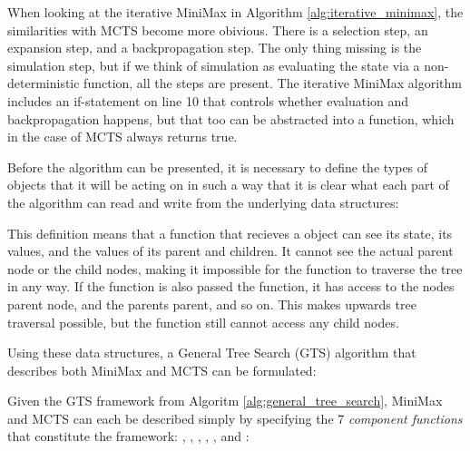 

When looking at the iterative MiniMax in Algorithm \ref{alg:iterative_minimax}, the similarities with MCTS become more obivious. There is a selection step, an expansion step, and a backpropagation step. The only thing missing is the simulation step, but if we think of simulation as evaluating the state via a non-deterministic function, all the steps are present. The iterative MiniMax algorithm includes an if-statement on line 10 that controls whether evaluation and backpropagation happens, but that too can be abstracted into a  function, which in the case of MCTS always returns true. 

Before the algorithm can be presented, it is necessary to define the types of objects that it will be acting on in such a way that it is clear what each part of the algorithm can read and write from the underlying data structures:



This definition means that a function that recieves a  object can see its state, its values, and the values of its parent and children. It cannot see the actual parent node or the child nodes, making it impossible for the function to traverse the tree in any way. If the function is also passed the  function, it has access to the nodes parent node, and the parents parent, and so on. This makes upwards tree traversal possible, but the function still cannot access any child nodes.

Using these data structures, a General Tree Search (GTS) algorithm that describes both MiniMax and MCTS can be formulated:



Given the GTS framework from Algoritm \ref{alg:general_tree_search}, MiniMax and MCTS can each be described simply by specifying the 7 \textit{component functions} that constitute the framework: , , , , , and :

